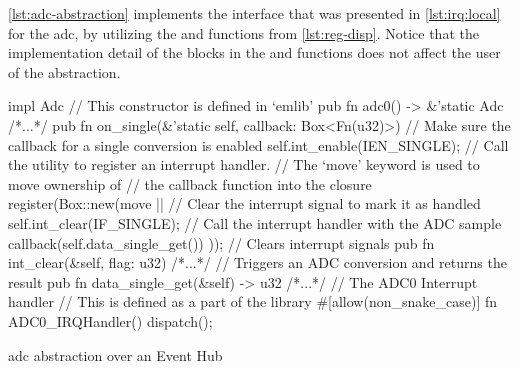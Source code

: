 \autoref{lst:adc-abstraction} implements the interface that was presented in \autoref{lst:irq:local} for the \gls{adc}, by utilizing the  and  functions from \autoref{lst:reg-disp}.
Notice that the implementation detail of the {\unsafe} blocks in the  and  functions does not affect the user of the abstraction.


\begin{listing}[H]
  \begin{rustcode}
impl Adc {
  // This constructor is defined in `emlib'
  pub fn adc0() -> &'static Adc { /*...*/ }
  pub fn on_single(&'static self, callback: Box<Fn(u32)>) {
    // Make sure the callback for a single conversion is enabled
    self.int_enable(IEN_SINGLE);
    // Call the utility to register an interrupt handler.
    // The `move' keyword is used to move ownership of
    // the callback function into the closure
    register(Box::new(move || {
      // Clear the interrupt signal to mark it as handled
      self.int_clear(IF_SINGLE);
      // Call the interrupt handler with the ADC sample
      callback(self.data_single_get())
    }));
  }
  // Clears interrupt signals
  pub fn int_clear(&self, flag: u32) { /*...*/ }
  // Triggers an ADC conversion and returns the result
  pub fn data_single_get(&self) -> u32 { /*...*/ }
}
// The ADC0 Interrupt handler
// This is defined as a part of the library
#[allow(non_snake_case)]
fn ADC0_IRQHandler() {
  dispatch();
}
  \end{rustcode}
  \caption{\gls{adc} abstraction over an Event Hub}
  \label{lst:adc-abstraction}
\end{listing}




